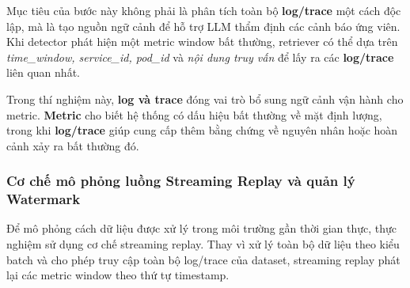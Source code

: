Mục tiêu của bước này không phải là phân tích toàn bộ \textbf{log/trace} một cách độc lập, mà là tạo nguồn ngữ cảnh để hỗ trợ LLM thẩm định các cảnh báo ứng viên. Khi detector phát hiện một metric window bất thường, retriever có thể dựa trên \textit{time\_window, service\_id, pod\_id} và \textit{nội dung truy vấn} để lấy ra các \textbf{log/trace} liên quan nhất.

Trong thí nghiệm này, \textbf{log và trace} đóng vai trò bổ sung ngữ cảnh vận hành cho metric. \textbf{Metric} cho biết hệ thống có dấu hiệu bất thường về mặt định lượng, trong khi \textbf{log/trace} giúp cung cấp thêm bằng chứng về nguyên nhân hoặc hoàn cảnh xảy ra bất thường đó.
\subsubsection{Cơ chế mô phỏng luồng Streaming Replay và quản lý Watermark}
Để mô phỏng cách dữ liệu được xử lý trong môi trường gần thời gian thực, thực nghiệm sử dụng cơ chế streaming replay. Thay vì xử lý toàn bộ dữ liệu theo kiểu batch và cho phép truy cập toàn bộ log/trace của dataset, streaming replay phát lại các metric window theo thứ tự timestamp.
